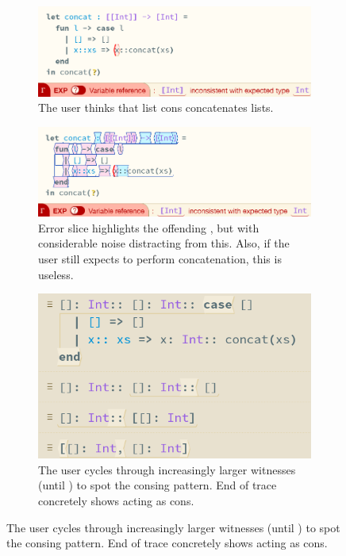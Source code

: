 {\begin{figure}[H]
\centering
\begin{subfigure}[t]{0.49\textwidth}
\centering
\includegraphics[width=1\textwidth]{Media/Figures/concat_error}
\caption{The user thinks that list cons \code{::} concatenates lists.}
\end{subfigure}
\begin{subfigure}[t]{0.49\textwidth}
\centering
\includegraphics[width=1\textwidth]{Media/Figures/concat_error_type_slice}
\caption{Error slice highlights the offending \code{::}, but with considerable noise distracting from this. Also, if the user still expects \code{::} to perform concatenation, this is useless.}
\end{subfigure}
\begin{subfigure}{0.49\textwidth}
\centering
\includegraphics[width=1\textwidth]{Media/Figures/concat_error_trace}
\caption{The user cycles through increasingly larger witnesses (until \code{[[], []]}) to spot the consing pattern. End of trace concretely shows \code{::} acting as cons.}

\end{subfigure}
\end{figure}}
